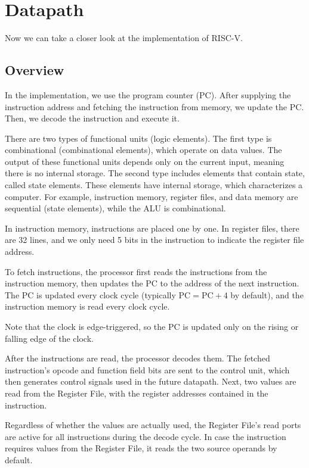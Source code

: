\chapter{Datapath}
Now we can take a closer look at the implementation of RISC-V. 

\section{Overview}
In the implementation, we use the program counter (PC). After supplying the instruction address and fetching the instruction from memory, we update the PC. Then, we decode the instruction and execute it.

There are two types of functional units (logic elements). The first type is combinational (combinational elements), which operate on data values. The output of these functional units depends only on the current input, meaning there is no internal storage. The second type includes elements that contain state, called state elements. These elements have internal storage, which characterizes a computer. For example, instruction memory, register files, and data memory are sequential (state elements), while the ALU is combinational.

\begin{remark}
  In instruction memory, instructions are placed one by one. In register files, there are 32 lines, and we only need 5 bits in the instruction to indicate the register file address.
\end{remark}

To fetch instructions, the processor first reads the instructions from the instruction memory, then updates the PC to the address of the next instruction. The PC is updated every clock cycle (typically \(\text{PC} = \text{PC} + 4\) by default), and the instruction memory is read every clock cycle.

Note that the clock is edge-triggered, so the PC is updated only on the rising or falling edge of the clock.

After the instructions are read, the processor decodes them. The fetched instruction's opcode and function field bits are sent to the control unit, which then generates control signals used in the future datapath. Next, two values are read from the Register File, with the register addresses contained in the instruction. 

Regardless of whether the values are actually used, the Register File's read ports are active for all instructions during the decode cycle. In case the instruction requires values from the Register File, it reads the two source operands by default. 

